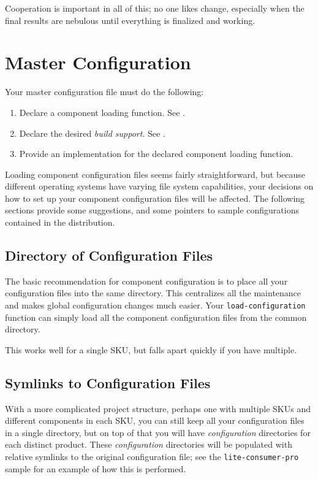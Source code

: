 Cooperation is important in all of this; no one likes change,
especially when the final results are nebulous until everything is
finalized and working.

\section{Master Configuration}\label{wrap:master-configuration}
\label{wrap:techniques}

Your master configuration file must do the following:

\begin{enumerate}
\item Declare a component loading function.  See
  .
\item Declare the desired \emph{build support}.  See
  .
\item Provide an implementation for the declared component loading
  function.
\end{enumerate}

Loading component configuration files seems fairly straightforward,
but because different operating systems have varying file system
capabilities, your decisions on how to set up your component
configuration files will be affected.  The following sections provide
some suggestions, and some pointers to sample configurations contained
in the \lmsbw distribution.

\subsection{Directory of Configuration Files}\label{wrap:directory}

The basic recommendation for \lmsbw component configuration is to
place all your configuration files into the same directory.  This
centralizes all the maintenance and makes global configuration changes
much easier.  Your \texttt{load-configuration} function can simply
load all the component configuration files from the common directory.

This works well for a single SKU, but falls apart quickly if you have
multiple.

\subsection{Symlinks to Configuration Files}

With a more complicated project structure, perhaps one with multiple
SKUs and different components in each SKU, you can still keep all your
configuration files in a single directory, but on top of that you will
have \emph{configuration} directories for each distinct product.
These \emph{configuration} directories will be populated with relative
symlinks to the original configuration file; see the
\texttt{lite-consumer-pro} sample for an example of how this is
performed.


